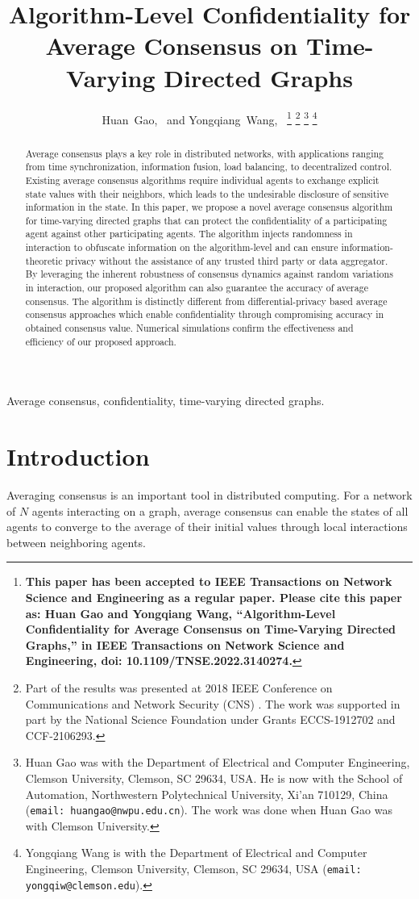 \documentclass{IEEEtran}
\title{\LARGE \bf Algorithm-Level Confidentiality for Average Consensus on Time-Varying Directed Graphs}
\author{Huan~Gao,~\IEEEmembership{Member,~IEEE,} and Yongqiang~Wang,~\IEEEmembership{Senior~Member,~IEEE}
\thanks{\bf This paper has been accepted to IEEE Transactions on Network Science and Engineering as a regular paper. Please cite this paper as: Huan Gao and Yongqiang Wang, ``Algorithm-Level Confidentiality for Average Consensus on Time-Varying Directed Graphs,'' in IEEE Transactions on Network Science and Engineering, doi: 10.1109/TNSE.2022.3140274.}
\thanks{Part of the results was presented at 2018 IEEE Conference on Communications and Network Security (CNS) \cite{Huan2018CNS}. The work was supported in part by the National Science Foundation under Grants ECCS-1912702 and CCF-2106293.}
\thanks{Huan Gao was with the Department of Electrical and Computer Engineering, Clemson University, Clemson, SC 29634, USA. He is now with the School of Automation, Northwestern Polytechnical University, Xi'an 710129, China ({\tt\small email: huangao@nwpu.edu.cn}). The work was done when Huan Gao was with Clemson University.}
\thanks{Yongqiang Wang is with the Department of Electrical and Computer Engineering, Clemson University, Clemson, SC 29634, USA ({\tt\small email: yongqiw@clemson.edu}).}
}
\begin{document}
	
\maketitle

\begin{abstract}
Average consensus plays a key role in distributed networks, with applications ranging from time synchronization, information fusion, load balancing, to decentralized control. Existing average consensus algorithms require individual agents to exchange explicit state values with their neighbors, which leads to the undesirable disclosure of sensitive information in the state. In this paper, we propose a novel average consensus algorithm for time-varying directed graphs that can protect the confidentiality of a participating agent against other participating agents. The algorithm injects randomness in interaction to obfuscate information on the algorithm-level and can ensure information-theoretic privacy without the assistance of any trusted third party or data aggregator. By leveraging the inherent robustness of consensus dynamics against random variations in interaction, our proposed algorithm can also guarantee the accuracy of average consensus. The algorithm is distinctly different from differential-privacy based average consensus approaches which enable confidentiality through compromising accuracy in obtained consensus value. Numerical simulations confirm the effectiveness and efficiency of our proposed approach.
\end{abstract}

\begin{IEEEkeywords}
	Average consensus, confidentiality, time-varying directed graphs.
\end{IEEEkeywords}

\section{Introduction}

Averaging consensus is an important tool in distributed computing. For a network of $N$ agents interacting on a graph, average consensus can enable the states of all agents to converge to the average of their initial values through local interactions between neighboring agents.
\end{document}
